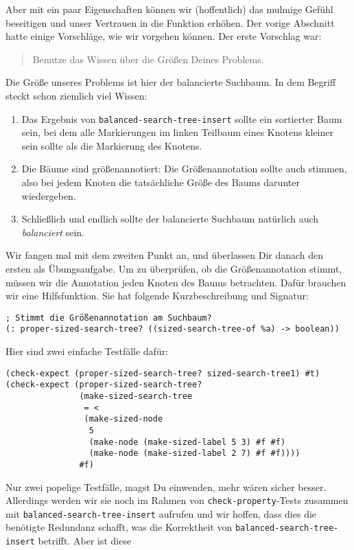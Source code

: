 Aber mit ein paar Eigenschaften können wir (hoffentlich) das mulmige
Gefühl beseitigen und unser Vertrauen in die Funktion erhöhen.  Der
vorige Abschnitt hatte einige Vorschläge, wie wir vorgehen können.
Der erste Vorschlag war:
%
\begin{quote}
  Benutze das Wissen über die Größen Deines Problems.
\end{quote}
%
Die Größe unseres Problems ist hier der balancierte Suchbaum.  In dem
Begriff steckt schon ziemlich viel Wissen:
%
\begin{enumerate}
\item Das Ergebnis von \lstinline{balanced-search-tree-insert} sollte ein
  sortierter Baum sein, bei dem alle Markierungen im linken Teilbaum
  eines Knotens kleiner sein sollte als die Markierung des Knotens.
\item Die Bäume sind größenannotiert: Die Größenannotation sollte auch
  stimmen, also bei jedem Knoten die tatsächliche Größe des Baums
  darunter wiedergeben.
\item Schließlich und endlich sollte der balancierte Suchbaum
  natürlich auch \emph{balanciert} sein.
\end{enumerate}
%
Wir fangen mal mit dem zweiten Punkt an, und überlassen Dir danach den
ersten als Übungsaufgabe.  Um zu überprüfen, ob die Größenannotation
stimmt, müssen wir die Annotation jeden Knoten des Baums betrachten.
Dafür brauchen wir eine Hilfsfunktion.  Sie hat folgende
Kurzbeschreibung und Signatur:
%
\begin{lstlisting}
; Stimmt die Größenannotation am Suchbaum?
(: proper-sized-search-tree? ((sized-search-tree-of %a) -> boolean))
\end{lstlisting}
%
Hier sind zwei einfache Testfälle dafür:
%
\begin{lstlisting}
(check-expect (proper-sized-search-tree? sized-search-tree1) #t)
(check-expect (proper-sized-search-tree?
               (make-sized-search-tree
                = <
                (make-sized-node
                 5
                 (make-node (make-sized-label 5 3) #f #f)
                 (make-node (make-sized-label 2 7) #f #f))))
               #f)
\end{lstlisting}              
%
Nur zwei popelige Testfälle, magst Du einwenden, mehr wären sicher
besser.  Allerdings werden wir sie noch im Rahmen von
\lstinline{check-property}-Tests zusammen mit
\lstinline{balanced-search-tree-insert} aufrufen und wir hoffen, dass
dies die benötigte Redundanz schafft, was die Korrektheit von
\lstinline{balanced-search-tree-insert} betrifft.  Aber ist diese
